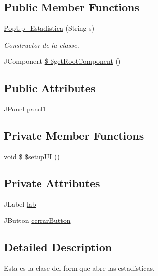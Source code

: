 \subsection*{Public Member Functions}
\begin{DoxyCompactItemize}
\item 
\hyperlink{classpresentacion_1_1form_1_1PopUp__Estadistica_a7f2277129654afa8b98cf5c48427b023}{Pop\+Up\+\_\+\+Estadistica} (String s)
\begin{DoxyCompactList}\small\item\em Constructor de la classe. \end{DoxyCompactList}\item 
J\+Component \hyperlink{classpresentacion_1_1form_1_1PopUp__Estadistica_afce5f0f85c8ea9dd27b7744063f3da6f}{\$ \$get\+Root\+Component} ()
\end{DoxyCompactItemize}
\subsection*{Public Attributes}
\begin{DoxyCompactItemize}
\item 
J\+Panel \hyperlink{classpresentacion_1_1form_1_1PopUp__Estadistica_ac276266d42b873f89883dd3a869feadf}{panel1}
\end{DoxyCompactItemize}
\subsection*{Private Member Functions}
\begin{DoxyCompactItemize}
\item 
void \hyperlink{classpresentacion_1_1form_1_1PopUp__Estadistica_a3d9efe7430fbea6b3db7fc7fa7ca89ee}{\$ \$setup\+UI} ()
\end{DoxyCompactItemize}
\subsection*{Private Attributes}
\begin{DoxyCompactItemize}
\item 
J\+Label \hyperlink{classpresentacion_1_1form_1_1PopUp__Estadistica_ac61ead9dea9a28c411062fdc951b4df8}{lab}
\item 
J\+Button \hyperlink{classpresentacion_1_1form_1_1PopUp__Estadistica_aad708c3569f3d964b09867708ba60bf6}{cerrar\+Button}
\end{DoxyCompactItemize}


\subsection{Detailed Description}
Esta es la clase del form que abre las estadísticas. 

